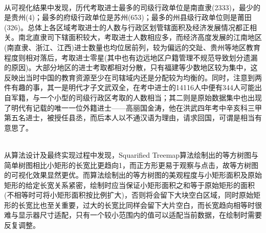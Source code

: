 \documentclass[11pt]{article}
\begin{document}
	\hspace*{\fill} \\
	
	从可视化结果中发现，历代考取进士最多的司级行政单位是南直隶(2333)，最少的是贵州(4)；最多的府级行政单位是苏州(653)；最多的州县级行政单位则是莆田(326)。总体上各区域考取进士的人数与行政区划管辖面积及经济发展情况都正相关。南北直隶司下辖面积较大，考取进士人数相应多，而经济高度发展的江南地区(南直隶、浙江、江西)进士数量也均位居前列，较为偏远的交趾、贵州等地区教育程度则相对落后，考取进士零星(其中也有边远地区户籍管理不规范导致划分遗漏的原因)。大部分地区的进士考取都相对分散，只有福建等少数地区较为集中，这反映出当时中国的教育资源至少在司辖域内还是分配较为均衡的。同时，注意到两件有趣的事，其一是明代才子文武双全，在考中进士的14116人中便有344人可能出自军籍，与一个小型的司级行政区考取的人数相当；其二则是原始数据集中也出现了明代有记载的唯一一位外籍进士——高丽国金涛，他在洪武四年考中辛亥科三甲第五名进士，被授任县丞，而后本人以不通汉语为理由，请求回国，可谓是相当有意思了。
	
	\hspace*{\fill} \\
	
	从算法设计及最终实现过程中发现，Squarified Treemap算法绘制出的等方树图与简单树图相比小矩形的长宽比更趋向1，而正方形更易于观察与点击，故等方树图的可视化效果显然更优。而算法绘制出的等方树图的美观程度与小矩形面积及原始矩形的给定长宽关系紧密，绘制时应当保证小矩形面积之和等于原始矩形的面积(不相等时可将小矩形面积按比例扩大)，否则将会留下大块空白区域，同时原始矩形的长宽比也至关重要，过大的长宽比同样会留下大片空白，而长宽趋向相等时很难与显示器尺寸适配，只有一个较小范围内的值可以适配当前数据，在绘制时需要反复调整。
	
\end{document}
